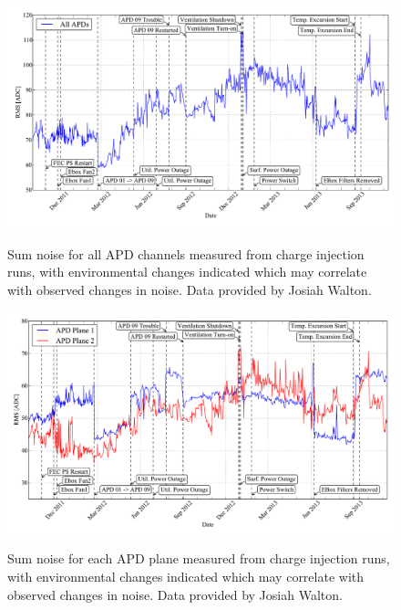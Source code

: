 \begin{figure}
\begin{center}
\includegraphics[keepaspectratio=true,width=\textwidth]{APDNoiseVsActions_sumall.pdf}
\end{center}
\renewcommand{\baselinestretch}{1}
\small\normalsize
\begin{quote}
\caption{Sum noise for all APD channels measured from charge injection runs, with environmental changes indicated which may correlate with observed changes in noise.  Data provided by Josiah Walton.}
\label{fig:APDSumAllNoise_JosiahEnvironmental}
\end{quote}
\end{figure}
\renewcommand{\baselinestretch}{2}
\small\normalsize

\begin{figure}
\begin{center}
\includegraphics[keepaspectratio=true,width=\textwidth]{APDNoiseVsActions_planes.pdf}
\end{center}
\renewcommand{\baselinestretch}{1}
\small\normalsize
\begin{quote}
\caption{Sum noise for each APD plane measured from charge injection runs, with environmental changes indicated which may correlate with observed changes in noise.  Data provided by Josiah Walton.}
\label{fig:APDSumPlaneNoise_JosiahEnvironmental}
\end{quote}
\end{figure}
\renewcommand{\baselinestretch}{2}
\small\normalsize

